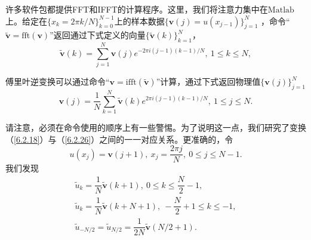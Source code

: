      许多软件包都提供FFT和IFFT的计算程序。这里，我们将注意力集中在$\mathrm{Matlab}$上。给定在$\{ x_k = 2\pi k/N  \}_{k = 0}^{N-1}$上的样本数据$\{ \textbf{v}(j) = u(x_{j-1}) \}_{j = 1}^N$ ，命令“$\widetilde{\textbf{v}} = \mathrm{fft} (\textbf{v})$”返回通过下式定义的向量$\{ \widetilde{\textbf{v}}(k) \}_{k = 1}^N$，        
\begin{equation}
    \widetilde{\textbf{v}}(k) = \sum_{j = 1}^N \textbf{v}(j)e^{-2\pi i(j-1)(k-1)/N}, \   1\leq k\leq N,
    \label{6.2.27}
\end{equation}         

    傅里叶逆变换可以通过命令“$\textbf{v} = \mathrm{ifft} (\widetilde{\textbf{v}})$”计算，通过下式返回物理值$\{ \textbf{v}(j) \}_{j = 1}^N$   
\begin{equation}
    \textbf{v}(j) = \dfrac{1}{N} \sum_{k = 1}^N \widetilde{\textbf{v}}(k)e^{2\pi i(j-1)(k-1)/N}, \   1\leq j\leq N.
    \label{6.2.28}
\end{equation}      
    
    请注意，必须在命令使用的顺序上有一些警惕。为了说明这一点，我们研究了变换（\ref{6.2.18}）与（\ref{6.2.26}）之间的一一对应关系。更准确的，令   
\begin{equation}
    u(x_j) = \textbf{v}(j+1), \  x_j = \dfrac{2\pi j}{N}, \  0\leq j\leq N-1.
    \label{6.2.29}
\end{equation}
    我们发现   
\begin{equation}
    \begin{array}{l}
        \widetilde{u}_k = \dfrac{1}{N}\widetilde{\textbf{v}}(k+1), \  0\leq k\leq \dfrac{N}{2}-1, \\
        \widetilde{u}_k = \dfrac{1}{N}\widetilde{\textbf{v}}(k+N+1), \   -\dfrac{N}{2}+1\leq k\leq -1, \\
        \widetilde{u}_{-N/2} = \widetilde{u}_{N/2} = \dfrac{1}{2N}\widetilde{\textbf{v}}(N/2+1).    
    \end{array}
    \label{6.2.30}
\end{equation}        
    
